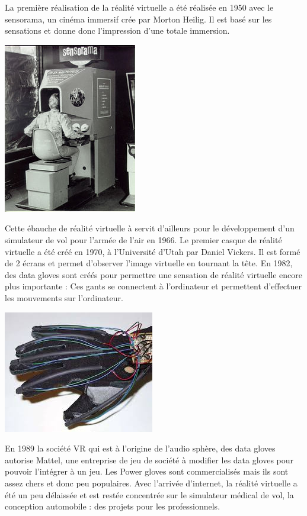 \documentclass[12pt, a4paper]{report}
\begin{document}
La première réalisation de la réalité virtuelle a été réalisée en 1950 avec le sensorama, un cinéma immersif crée par Morton Heilig. Il est basé sur les sensations et donne donc l'impression d'une totale immersion.
\begin{center}
\includegraphics[scale=0.27]{sensorama.jpg}
\end{center}




Cette ébauche de réalité virtuelle à servit d'ailleurs pour le développement d'un simulateur de vol pour l'armée de l'air en 1966. Le premier casque de réalité virtuelle a été créé en 1970, à l'Université d'Utah par Daniel Vickers. Il est formé de 2 écrans et permet d'observer l'image virtuelle en tournant la tête.
En 1982, des  data gloves  sont créés pour permettre une sensation de réalité virtuelle encore plus importante : Ces gants se connectent à l'ordinateur et permettent d'effectuer les mouvements sur l'ordinateur.


\begin{center}
\includegraphics[scale=0.4]{data.jpeg}
\end{center}

En 1989 la société VR qui est à l'origine de l'audio sphère, des data gloves autorise Mattel, une entreprise de jeu de société à modifier les data gloves pour pouvoir l'intégrer à un jeu. Les Power gloves sont commercialisés mais ils sont assez chers et donc peu populaires.
Avec l'arrivée d'internet, la réalité virtuelle a été un peu délaissée et est restée concentrée sur le simulateur médical de vol, la conception automobile : des projets pour les professionnels.
\end{document}
